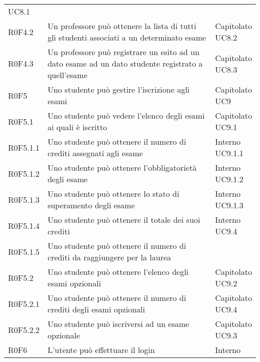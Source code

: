 \documentclass[AnalisiDeiRequisiti.tex]{subfiles}
\begin{document}
\begin{longtable}[H]{p{2cm}p{5.2cm}p{5cm}}
{		UC8.1
	} \\  
	R0F4.2 &  Un professore può ottenere la lista di tutti gli studenti associati a un determinato esame & \makecell[tl]{
		Capitolato  \\ 
		UC8.2
	} \\  
	R0F4.3 &  Un professore può registrare un esito ad un dato esame ad un dato studente registrato a quell'esame & \makecell[tl]{
		Capitolato \\ 
		UC8.3
	} \\  
	R0F5 &  Uno studente può gestire l'iscrizione agli esami & \makecell[tl]{
		Capitolato \\ 
		UC9
	} \\  
	R0F5.1 &  Uno studente può vedere l'elenco degli esami ai quali è iscritto & \makecell[tl]{
		Capitolato \\ 
		UC9.1
	} \\  
	R0F5.1.1 &  Uno studente può ottenere il numero di crediti assegnati agli esame & \makecell[tl]{
		Interno \\ 
		UC9.1.1
	} \\  
	R0F5.1.2 &  Uno studente può ottenere l'obbligatorietà degli esame & \makecell[tl]{
		Interno \\ 
		UC9.1.2
	} \\  
	R0F5.1.3 &  Uno studente può ottenere lo stato di superamento degli esame & \makecell[tl]{
		Interno \\ 
		UC9.1.3
	} \\  
	R0F5.1.4 &  Uno studente può ottenere il totale dei suoi crediti & \makecell[tl]{
		Interno \\ 
		UC9.4
	} \\  
	R0F5.1.5 &  Uno studente può ottenere il numero di crediti da raggiungere per la laurea & \makecell[tl]{
		Interno
	} \\  
	R0F5.2 &  Uno studente può ottenere l'elenco degli esami opzionali & \makecell[tl]{
		Capitolato \\ 
		UC9.2
	} \\  
	R0F5.2.1 &  Uno studente può ottenere il numero di crediti degli esami opzionali & \makecell[tl]{
		Capitolato \\ 
		UC9.4
	} \\  
	R0F5.2.2 &  Uno studente può iscriversi ad un esame opzionale & \makecell[tl]{
		Capitolato \\ 
		UC9.3
	} \\  
	R0F6 &  L'utente può effettuare il login & \makecell[tl]{
		Interno \\ 
}
\end{longtable}
\end{document}
